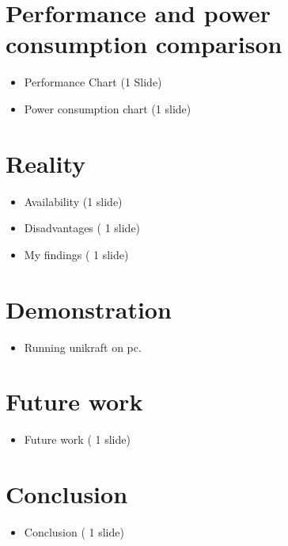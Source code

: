 \documentclass[11pt]{article}       %
\newenvironment{slide}[1]        {\section{#1} \begin{itemize}}%
                                 {\end{itemize}}
\begin{document}
\begin{slide}{Performance and power consumption comparison}
\item Performance Chart (1 Slide)
\item Power consumption chart (1 slide)

\end{slide}


\begin{slide}{Reality}
\item Availability (1 slide)
\item Disadvantages ( 1 slide)
\item My findings ( 1 slide) 
\end{slide}

\begin{slide}{Demonstration}
\item Running unikraft on pc.
\end{slide}

\begin{slide}{Future work}
\item Future work ( 1 slide) 
\end{slide}


\begin{slide}{Conclusion}
\item Conclusion ( 1 slide) 
\end{slide}






\end{document}

